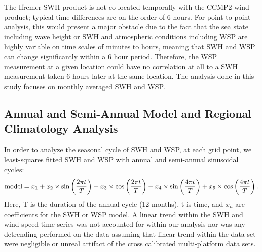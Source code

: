 \documentclass[draft,linenumbers]{agujournal2018}
\begin{document}
The Ifremer SWH product is not co-located temporally with the CCMP2 wind product; typical  time differences are on the order of 6 hours. For point-to-point analysis, this would present a major obstacle due to the fact that the sea state including wave height or SWH and atmospheric conditions including WSP are highly variable on time scales of minutes to hours, meaning that SWH and WSP can change significantly within a 6 hour period. Therefore, the WSP measurement at a given location could have no correlation at all to a SWH measurement taken 6 hours later at the same location. The analysis done in this study focuses on monthly averaged SWH and WSP.


\subsection{Annual and Semi-Annual Model and Regional Climatology Analysis}

In order to analyze the seasonal cycle of SWH and WSP, at each grid point, we least-squares fitted SWH and WSP with annual and semi-annual sinusoidal cycles: 
 \begin{equation}
     \mbox{\rm model} = x_1 + x_2\times\sin\left(\frac{2{\pi}t}{T}\right) +  x_3\times\cos\left(\frac{2{\pi}t}{T}\right) + x_4\times\sin\left(\frac{4{\pi}t}{T}\right) + x_5\times\cos\left(\frac{4{\pi}t}{T}\right).
 \end{equation}
Here, T is the duration of the annual cycle (12 months), t is time, and $x_n$ are coefficients for the SWH or WSP model. A linear trend within the SWH and wind speed time series was not accounted for within our analysis nor was any detrending performed on the data assuming that linear trend within the data set were negligible or unreal artifact of the cross calibrated multi-platform data sets.
\end{document}
